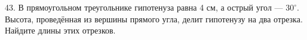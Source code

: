 43. В прямоугольном треугольнике гипотенуза равна 4 см, а острый угол --- $30^\circ.$ Высота, проведённая из вершины прямого угла, делит гипотенузу на два отрезка. Найдите длины этих отрезков.\\
